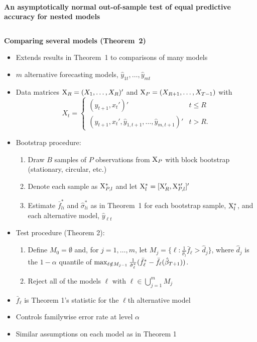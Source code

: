 \documentclass[final]{beamer}
\begin{document}
\begin{frame}{\\\centering \textbf{\huge An asymptotically normal out-of-sample
    test of equal predictive accuracy for nested models}}
\begin{columns}[t]
    \begin{column}{.23\textwidth}
      \begin{block}{\textbf{Comparing several models (Theorem~2)}}
        \begin{itemize}
        \item Extends results in Theorem~1 to comparisons of many
          models
        \item $m$ alternative forecasting models,
          $\hat{y}_{1t},\dots, \hat{y}_{mt}$
          \item Data matrices $\mathrm{X}_R = (X_1,\dots,X_R)'$
            and $\mathrm{X}_{P} = (X_{R+1},\dots,X_{T-1})$ with
            \begin{equation*}
              X_t = \begin{cases}
                (y_{t+1}, x_t')' & t \leq R \\
                (y_{t+1}, x_t', \hat{y}_{1,t+1}, \dots, \hat{y}_{m,t+1})' & t > R.
              \end{cases}
            \end{equation*}
        \item Bootstrap procedure:
          \begin{enumerate}
          \item Draw $B$ samples of $P$ observations from $\mathrm{X}_{P}$
            with block bootstrap (stationary, circular, etc.)
          \item Denote each sample as $\mathrm{X}_{P, l}^{*}$ and let
            $\mathrm{X}_l^{*} = [\mathrm{X}_{R}', \mathrm{X}_{P,l}^{*\prime}]'$
          \item Estimate $\bar{f}^{*}_{li}$ and
            $\hat{\sigma}_{li}^{*}$ as in Theorem~1 for each bootstrap
            sample, $\mathrm{X}^{*}_l$, and each alternative model,
            $\hat{y}_{\ell t}$
          \end{enumerate}
        \item Test procedure (Theorem 2):
          \begin{enumerate}
          \item Define $M_0 = \emptyset$ and, for $j = 1,\dots,m$, let
            $M_j = \{\ell : \tfrac1{\hat\sigma_l} \bar{f}_{\ell} >
            \hat{d}_j\}$, where $\hat{d}_j$ is the $1-\alpha$ quantile
            of $\max_{\ell \notin M_{j-1}}
            \tfrac{1}{\hat{\sigma}_\ell^{*}}(\bar{f}_{\ell}^{*} -
            \bar{f_\ell}(\btrue[*]))$.
          \item Reject all of the models $\ell$ with $\ell \in
            \bigcup_{j=1}^m M_j$
          \end{enumerate}
        \item $\bar f_\ell$ is Theorem 1's statistic for the $\ell$th
          alternative model
        \item Controls familywise error rate at level $\alpha$
        \item Similar assumptions on each model as in Theorem 1
        \end{itemize}
      \end{block}


\end{column}
\end{columns}
\end{frame}
\end{document}
